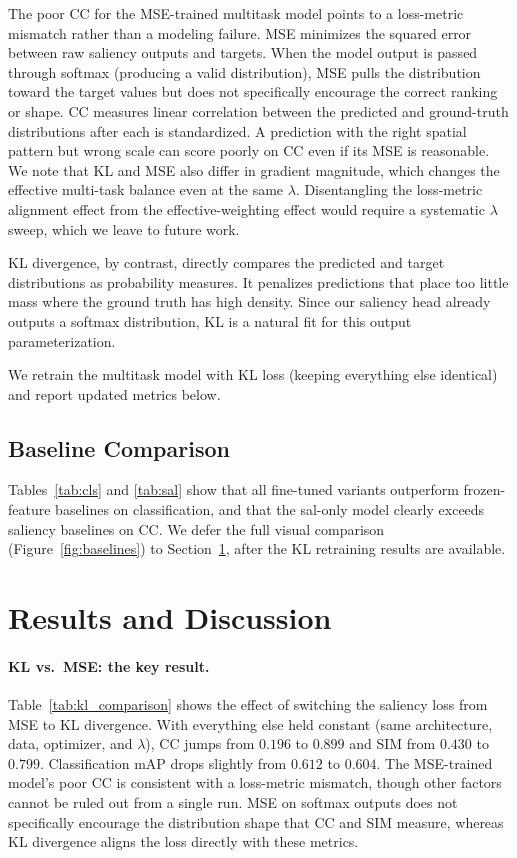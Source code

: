 \documentclass{article}
\begin{document}
The poor CC for the MSE-trained multitask model points to a loss-metric mismatch rather than a modeling failure. MSE minimizes the squared error between raw saliency outputs and targets. When the model output is passed through softmax (producing a valid distribution), MSE pulls the distribution toward the target values but does not specifically encourage the correct ranking or shape. CC measures linear correlation between the predicted and ground-truth distributions after each is standardized. A prediction with the right spatial pattern but wrong scale can score poorly on CC even if its MSE is reasonable. We note that KL and MSE also differ in gradient magnitude, which changes the effective multi-task balance even at the same $\lambda$. Disentangling the loss-metric alignment effect from the effective-weighting effect would require a systematic $\lambda$ sweep, which we leave to future work.

KL divergence, by contrast, directly compares the predicted and target distributions as probability measures. It penalizes predictions that place too little mass where the ground truth has high density. Since our saliency head already outputs a softmax distribution, KL is a natural fit for this output parameterization.

We retrain the multitask model with KL loss (keeping everything else identical) and report updated metrics below.

\subsection{Baseline Comparison}

Tables~\ref{tab:cls} and \ref{tab:sal} show that all fine-tuned variants outperform frozen-feature baselines on classification, and that the sal-only model clearly exceeds saliency baselines on CC. We defer the full visual comparison (Figure~\ref{fig:baselines}) to Section~\ref{sec:kl_results}, after the KL retraining results are available.

\section{Results and Discussion}
\label{sec:kl_results}

\paragraph{KL vs.\ MSE: the key result.}
Table~\ref{tab:kl_comparison} shows the effect of switching the saliency loss from MSE to KL divergence. With everything else held constant (same architecture, data, optimizer, and $\lambda$), CC jumps from $0.196$ to $0.899$ and SIM from $0.430$ to $0.799$. Classification mAP drops slightly from $0.612$ to $0.604$. The MSE-trained model's poor CC is consistent with a loss-metric mismatch, though other factors cannot be ruled out from a single run. MSE on softmax outputs does not specifically encourage the distribution shape that CC and SIM measure, whereas KL divergence aligns the loss directly with these metrics.
\end{document}
